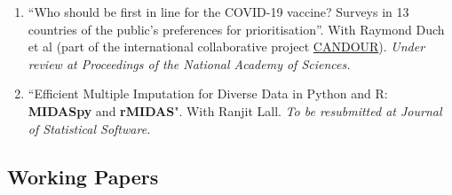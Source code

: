 \documentclass[11pt, a4paper]{article}
\begin{document}
\begin{enumerate}

  \item ``Who should be first in line for the COVID-19 vaccine? Surveys in 13 countries of the public’s preferences for prioritisation''. With Raymond Duch et al (part of the international collaborative project \href{https://oxford-candour.com/}{CANDOUR}). \textit{Under review at Proceedings of the National Academy of Sciences.}

  \item ``Efficient Multiple Imputation for Diverse Data in Python and R: \textbf{MIDASpy} and \textbf{rMIDAS}". With Ranjit Lall. \textit{To be resubmitted at Journal of Statistical Software.}

\end{enumerate}

\subsection*{Working Papers}
\end{document}
